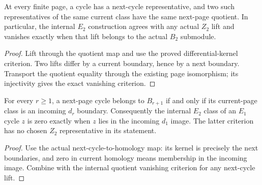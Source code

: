 \begin{proposition}
  \label{prop:h6-first-cycle-internal-class}
  \leanok
  At every finite page, a cycle has a next-cycle representative, and two
  such representatives of the same current class have the same next-page
  quotient. In particular, the internal $E_2$ construction agrees with
  any actual $Z_2$ lift and vanishes exactly when that lift belongs to
  the actual $B_2$ submodule.
\end{proposition}
\begin{proof}
  Lift through the quotient map and use the proved differential-kernel
  criterion. Two lifts differ by a current boundary, hence by a next
  boundary. Transport the quotient equality through the existing page
  isomorphism; its injectivity gives the exact vanishing criterion.
  \leanok
\end{proof}

\begin{proposition}
  \label{prop:h6-internal-first-cycle-image}
  \leanok
  For every $r\geq1$, a next-page cycle belongs to $B_{r+1}$ if and only
  if its current-page class is an incoming $d_r$ boundary. Consequently
  the internal $E_2$ class of an $E_1$ cycle $z$ is zero exactly when
  $z$ lies in the incoming $d_1$ image. The latter criterion has no
  chosen $Z_2$ representative in its statement.
\end{proposition}
\begin{proof}
  Use the actual next-cycle-to-homology map: its kernel is precisely
  the next boundaries, and zero in current homology means membership
  in the incoming image. Combine with the internal quotient vanishing
  criterion for any next-cycle lift.
  \leanok
\end{proof}

